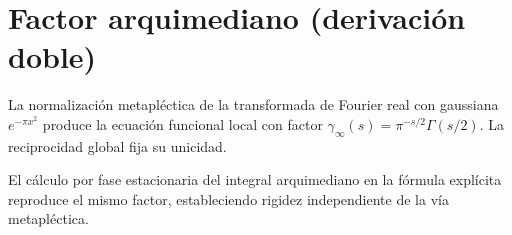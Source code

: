 \section{Factor arquimediano (derivación doble)}

\begin{theorem}
La normalización metapléctica de la transformada de Fourier real con gaussiana
$e^{-\pi x^2}$ produce la ecuación funcional local con factor
$\gamma_\infty(s)=\pi^{-s/2}\Gamma(s/2)$. La reciprocidad global fija su unicidad.
\end{theorem}

\begin{prop}
El cálculo por fase estacionaria del integral arquimediano en la fórmula explícita
reproduce el mismo factor, estableciendo rigidez independiente de la vía metapléctica.
\end{prop}
